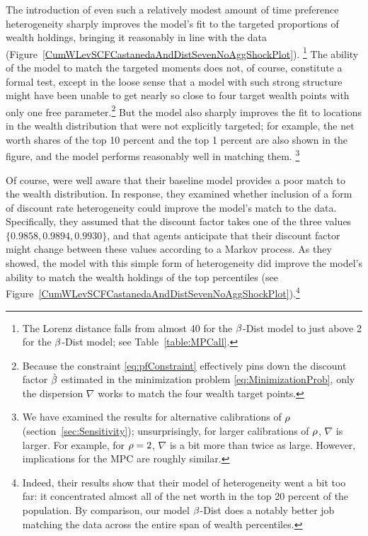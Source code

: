 \documentclass[12pt,titlepage]{econtex}
\begin{document}
The introduction of even such a relatively modest amount of time
preference heterogeneity sharply improves the model's fit to the targeted
proportions of wealth holdings, bringing it reasonably in line with the data (Figure~\ref{CumWLevSCFCastanedaAndDistSevenNoAggShockPlot}).%
\footnote{The Lorenz distance falls from almost 40 for the $\beta$-Dist model to just above 2 for the $\beta$-Dist model; see Table~\ref{table:MPCall}.}
 The
ability of the model to match the targeted moments does not, of
course, constitute a formal test, except in the loose sense that a
model with such strong structure might have been unable to get nearly
so close to four target wealth points with only one free
parameter.\footnote{Because the constraint \eqref{eq:pfConstraint} effectively pins down the discount factor $\grave{\beta}$
estimated in the minimization problem \eqref{eq:MinimizationProb},
   only the dispersion $\nabla$ works to match the four wealth target points.} But the model also sharply improves the fit to locations in
the wealth distribution that were not explicitly targeted; for
example, the net worth shares of the top 10 percent and the top 1
percent are also shown in the figure, and the model performs
reasonably well in matching them.%
\footnote{%
We have examined the results for alternative calibrations of $\rho$ (section~\ref{sec:Sensitivity}); unsurprisingly, for larger calibrations of $\rho$, $\nabla$ is larger.  For example, for $\rho=2$, $\nabla$ is a bit more than twice as large.  However, implications for the MPC are roughly similar.
}

Of course, \citet{ksHeteroPort,ksHetero} were well aware that their baseline model
provides a poor match to the wealth distribution.  In response, they
examined whether inclusion of a form of discount rate heterogeneity
could improve the model's match to the data.  Specifically, they
assumed that the discount factor takes one of the three values
$\{0.9858, 0.9894, 0.9930\}$, and that agents anticipate that
their discount factor might change between these values according to a
Markov process. As they showed, the model with this simple form of
heterogeneity did improve the model's ability to match the wealth
holdings of the top percentiles (see Figure~\ref{CumWLevSCFCastanedaAndDistSevenNoAggShockPlot}).\footnote{Indeed, their results show that their model of heterogeneity went a bit too far: it concentrated almost all of the net worth in the top 20 percent of the population.  By comparison, our model $\beta$-Dist does a notably better job matching the data across the entire span of wealth percentiles.}
\end{document}
